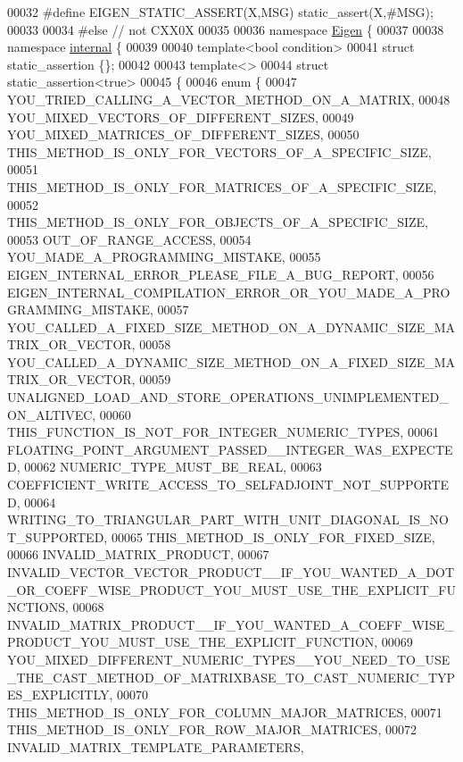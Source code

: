 \begin{DoxyCode}
00032 \textcolor{preprocessor}{    #define EIGEN\_STATIC\_ASSERT(X,MSG) static\_assert(X,#MSG);}
00033 
00034 \textcolor{preprocessor}{  #else // not CXX0X}
00035 
00036     \textcolor{keyword}{namespace }\hyperlink{namespace_eigen}{Eigen} \{
00037 
00038     \textcolor{keyword}{namespace }\hyperlink{namespaceinternal}{internal} \{
00039 
00040     \textcolor{keyword}{template}<\textcolor{keywordtype}{bool} condition>
00041     \textcolor{keyword}{struct }static\_assertion \{\};
00042 
00043     \textcolor{keyword}{template}<>
00044     \textcolor{keyword}{struct }static\_assertion<true>
00045     \{
00046       \textcolor{keyword}{enum} \{
00047         YOU\_TRIED\_CALLING\_A\_VECTOR\_METHOD\_ON\_A\_MATRIX,
00048         YOU\_MIXED\_VECTORS\_OF\_DIFFERENT\_SIZES,
00049         YOU\_MIXED\_MATRICES\_OF\_DIFFERENT\_SIZES,
00050         THIS\_METHOD\_IS\_ONLY\_FOR\_VECTORS\_OF\_A\_SPECIFIC\_SIZE,
00051         THIS\_METHOD\_IS\_ONLY\_FOR\_MATRICES\_OF\_A\_SPECIFIC\_SIZE,
00052         THIS\_METHOD\_IS\_ONLY\_FOR\_OBJECTS\_OF\_A\_SPECIFIC\_SIZE,
00053         OUT\_OF\_RANGE\_ACCESS,
00054         YOU\_MADE\_A\_PROGRAMMING\_MISTAKE,
00055         EIGEN\_INTERNAL\_ERROR\_PLEASE\_FILE\_A\_BUG\_REPORT,
00056         EIGEN\_INTERNAL\_COMPILATION\_ERROR\_OR\_YOU\_MADE\_A\_PROGRAMMING\_MISTAKE,
00057         YOU\_CALLED\_A\_FIXED\_SIZE\_METHOD\_ON\_A\_DYNAMIC\_SIZE\_MATRIX\_OR\_VECTOR,
00058         YOU\_CALLED\_A\_DYNAMIC\_SIZE\_METHOD\_ON\_A\_FIXED\_SIZE\_MATRIX\_OR\_VECTOR,
00059         UNALIGNED\_LOAD\_AND\_STORE\_OPERATIONS\_UNIMPLEMENTED\_ON\_ALTIVEC,
00060         THIS\_FUNCTION\_IS\_NOT\_FOR\_INTEGER\_NUMERIC\_TYPES,
00061         FLOATING\_POINT\_ARGUMENT\_PASSED\_\_INTEGER\_WAS\_EXPECTED,
00062         NUMERIC\_TYPE\_MUST\_BE\_REAL,
00063         COEFFICIENT\_WRITE\_ACCESS\_TO\_SELFADJOINT\_NOT\_SUPPORTED,
00064         WRITING\_TO\_TRIANGULAR\_PART\_WITH\_UNIT\_DIAGONAL\_IS\_NOT\_SUPPORTED,
00065         THIS\_METHOD\_IS\_ONLY\_FOR\_FIXED\_SIZE,
00066         INVALID\_MATRIX\_PRODUCT,
00067         
      INVALID\_VECTOR\_VECTOR\_PRODUCT\_\_IF\_YOU\_WANTED\_A\_DOT\_OR\_COEFF\_WISE\_PRODUCT\_YOU\_MUST\_USE\_THE\_EXPLICIT\_FUNCTIONS,
00068         INVALID\_MATRIX\_PRODUCT\_\_IF\_YOU\_WANTED\_A\_COEFF\_WISE\_PRODUCT\_YOU\_MUST\_USE\_THE\_EXPLICIT\_FUNCTION,
00069         
      YOU\_MIXED\_DIFFERENT\_NUMERIC\_TYPES\_\_YOU\_NEED\_TO\_USE\_THE\_CAST\_METHOD\_OF\_MATRIXBASE\_TO\_CAST\_NUMERIC\_TYPES\_EXPLICITLY,
00070         THIS\_METHOD\_IS\_ONLY\_FOR\_COLUMN\_MAJOR\_MATRICES,
00071         THIS\_METHOD\_IS\_ONLY\_FOR\_ROW\_MAJOR\_MATRICES,
00072         INVALID\_MATRIX\_TEMPLATE\_PARAMETERS,

\end{DoxyCode}
